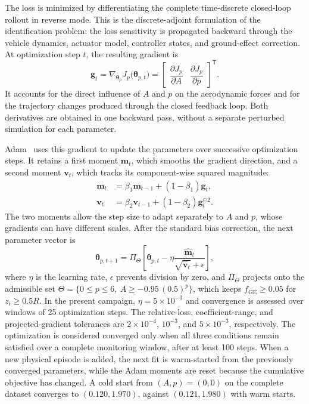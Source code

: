 \documentclass[journal]{IEEEtran}
\begin{document}
The loss is minimized by differentiating the complete time-discrete closed-loop rollout in reverse mode. This is the discrete-adjoint formulation of the identification problem: the loss sensitivity is propagated backward through the vehicle dynamics, actuator model, controller states, and ground-effect correction. At optimization step $t$, the resulting gradient is
\begin{equation}
 \mathbf{g}_t=
 \nabla_{\boldsymbol{\theta}_p}J_p
 \bigl(\boldsymbol{\theta}_{p,t}\bigr)
 =
 \begin{bmatrix}
 \dfrac{\partial J_p}{\partial A} &
 \dfrac{\partial J_p}{\partial p}
 \end{bmatrix}^{\mathsf T}.
 \label{eq:adjoint-gradient}
\end{equation}
It accounts for the direct influence of $A$ and $p$ on the aerodynamic forces and for the trajectory changes produced through the closed feedback loop. Both derivatives are obtained in one backward pass, without a separate perturbed simulation for each parameter.

Adam~\cite{Kingma2015} uses this gradient to update the parameters over successive optimization steps. It retains a first moment $\mathbf{m}_t$, which smooths the gradient direction, and a second moment $\mathbf{v}_t$, which tracks its component-wise squared magnitude:
\begin{align}
 \mathbf{m}_t &=
 \beta_1\mathbf{m}_{t-1}
 +(1-\beta_1)\mathbf{g}_t,\\
 \mathbf{v}_t &=
 \beta_2\mathbf{v}_{t-1}
 +(1-\beta_2)\mathbf{g}_t^{\odot 2}.
 \label{eq:adam-moments}
\end{align}
The two moments allow the step size to adapt separately to $A$ and $p$, whose gradients can have different scales. After the standard bias correction, the next parameter vector is
\begin{equation}
 \boldsymbol{\theta}_{p,t+1}=
 \Pi_{\Theta}\!\left[
 \boldsymbol{\theta}_{p,t}
 -\eta
 \frac{\widehat{\mathbf{m}}_t}
 {\sqrt{\widehat{\mathbf{v}}_t}+\epsilon}
 \right],
 \label{eq:adjoint-adam}
\end{equation}
where $\eta$ is the learning rate, $\epsilon$ prevents division by zero, and $\Pi_{\Theta}$ projects onto the admissible set $\Theta=\{0\leq p\leq6,\ A\geq-0.95\,(0.5)^{p}\}$, which keeps $f_{\mathrm{GE}}\geq0.05$ for $z_i\geq0.5R$. In the present campaign, $\eta=5\times10^{-3}$ and convergence is assessed over windows of 25 optimization steps. The relative-loss, coefficient-range, and projected-gradient tolerances are $2\times10^{-4}$, $10^{-3}$, and $5\times10^{-3}$, respectively. The optimization is considered converged only when all three conditions remain satisfied over a complete monitoring window, after at least 100 steps. When a new physical episode is added, the next fit is warm-started from the previously converged parameters, while the Adam moments are reset because the cumulative objective has changed. A cold start from $(A,p)=(0,0)$ on the complete dataset converges to $(0.120,1.970)$, against $(0.121,1.980)$ with warm starts.
\end{document}

